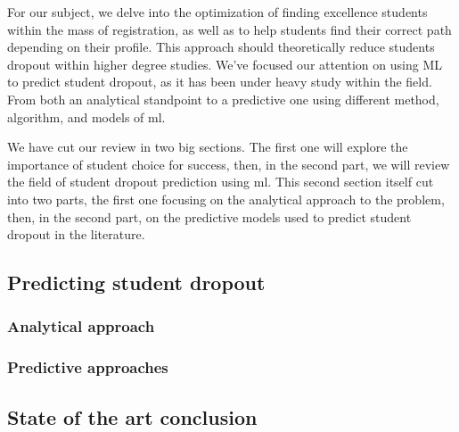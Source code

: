 \documentclass[../main.tex]{subfiles}
\begin{document}
For our subject, we delve into the optimization of finding excellence students within the mass of registration, as well as to help students find their correct path depending on their profile. This approach should theoretically reduce students dropout within higher degree studies.
We've focused our attention on using ML to predict student dropout, as it has been under heavy study within the field. From both an analytical standpoint to a predictive one using different method, algorithm, and models of \acrfull{ml}.

We have cut our review in two big sections. The first one will explore the importance of student choice for success, then, in the second part, we will review the field of student dropout prediction using \acrfull{ml}. This second section itself cut into two parts, the first one focusing on the analytical approach to the problem, then, in the second part, on the predictive models used to predict student dropout in the literature.

\subsection{Predicting student dropout}
\label{subsec:soa_predictingstudentdropout}


\subsubsection{Analytical approach}
\label{subsubsec:soa_analyticalapproach}



\subsubsection{Predictive approaches}
\label{subsubsec:soa_predictiveapproach}


\vspace{8pt}
\subsection{State of the art conclusion}
\label{subsec:soa_cc}

\end{document}
